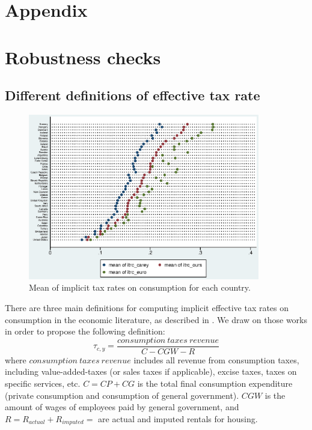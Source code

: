 \section*{\LARGE Appendix}
\renewcommand{\thefigure}{\thesubsection.\alph{figure}}

\section{Robustness checks}
\subsection{Different definitions of effective tax rate}
\label{appendix_itrc}

\begin{figure}[!ht]
\centering
\includegraphics[width=0.9\textwidth]{"images/18-09 itrc_comparison"}
\caption{Mean of implicit tax rates on consumption for each country.}
\label{fig:itrc_comparison}  
\end{figure}

There are three main definitions for computing implicit effective tax rates on consumption in the economic literature, as described in \cite{euro2016taxation, mendoza1994effective, carey2000average}. We draw on those works in order to propose the following definition:
\[ \tau_{c,y} = \frac{consumption\ taxes\ revenue}{C - CGW - R } \]
where $consumption\ taxes\ revenue$ includes all revenue from consumption taxes, including value-added-taxes (or sales taxes if applicable), excise taxes, taxes on specific services, etc. $C = CP + CG$ is the total final consumption expenditure (private consumption and consumption of general government). $CGW$ is the amount of wages of employees paid by general government, and $R = R_{actual} + R_{imputed} =$ are actual and imputed rentals for housing.

